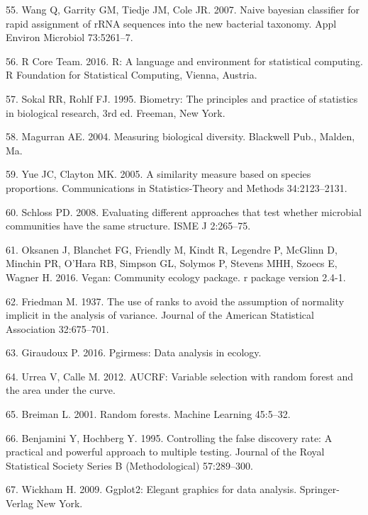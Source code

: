 \documentclass[12pt,]{article}
\begin{document}
\hypertarget{ref-wang_taxonomy_2007}{}
55. Wang Q, Garrity GM, Tiedje JM, Cole JR. 2007. Naive bayesian
classifier for rapid assignment of rRNA sequences into the new bacterial
taxonomy. Appl Environ Microbiol 73:5261--7.

\hypertarget{ref-R}{}
56. R Core Team. 2016. R: A language and environment for statistical
computing. R Foundation for Statistical Computing, Vienna, Austria.

\hypertarget{ref-sokal_biometrystats_1995}{}
57. Sokal RR, Rohlf FJ. 1995. Biometry: The principles and practice of
statistics in biological research, 3rd ed. Freeman, New York.

\hypertarget{ref-magurran_measuring_2004}{}
58. Magurran AE. 2004. Measuring biological diversity. Blackwell Pub.,
Malden, Ma.

\hypertarget{ref-yue_thetaYC_2005}{}
59. Yue JC, Clayton MK. 2005. A similarity measure based on species
proportions. Communications in Statistics-Theory and Methods
34:2123--2131.

\hypertarget{ref-schloss_commstruct_2008}{}
60. Schloss PD. 2008. Evaluating different approaches that test whether
microbial communities have the same structure. ISME J 2:265--75.

\hypertarget{ref-oksanen_vegan_2016}{}
61. Oksanen J, Blanchet FG, Friendly M, Kindt R, Legendre P, McGlinn D,
Minchin PR, O'Hara RB, Simpson GL, Solymos P, Stevens MHH, Szoecs E,
Wagner H. 2016. Vegan: Community ecology package. r package version
2.4-1.

\hypertarget{ref-friedman_1937}{}
62. Friedman M. 1937. The use of ranks to avoid the assumption of
normality implicit in the analysis of variance. Journal of the American
Statistical Association 32:675--701.

\hypertarget{ref-pgirmess}{}
63. Giraudoux P. 2016. Pgirmess: Data analysis in ecology.

\hypertarget{ref-AUCRF}{}
64. Urrea V, Calle M. 2012. AUCRF: Variable selection with random forest
and the area under the curve.

\hypertarget{ref-breiman_rf_2001}{}
65. Breiman L. 2001. Random forests. Machine Learning 45:5--32.

\hypertarget{ref-Benjamini_Hochberg_1995}{}
66. Benjamini Y, Hochberg Y. 1995. Controlling the false discovery rate:
A practical and powerful approach to multiple testing. Journal of the
Royal Statistical Society Series B (Methodological) 57:289--300.

\hypertarget{ref-ggplot2}{}
67. Wickham H. 2009. Ggplot2: Elegant graphics for data analysis.
Springer-Verlag New York.
\end{document}
